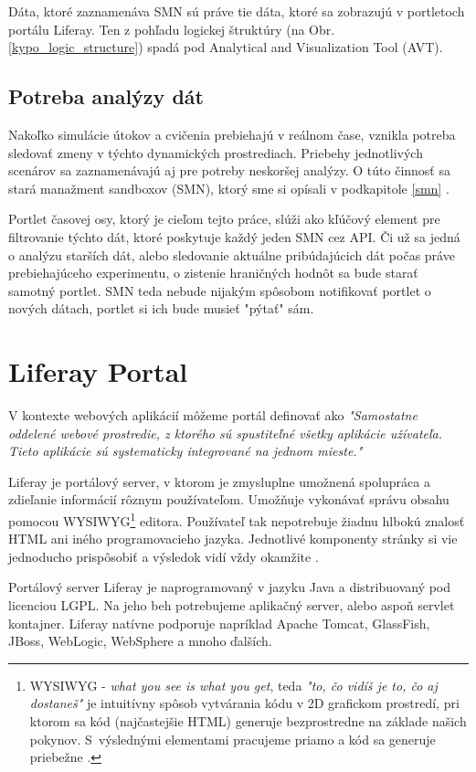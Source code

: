 \documentclass[
  printed, %
  twoside, %
  notable,   %
  nolof,   %
  nolot,   %
]{fithesis3}
\newcommand{\inquotes}[1]{{}"{}#1{}"{}}
\begin{document}
Dáta, ktoré zaznamenáva SMN sú práve tie dáta, ktoré sa zobrazujú v portletoch portálu Liferay. Ten z pohľadu logickej štruktúry (na Obr. \ref{kypo_logic_structure}) spadá pod Analytical and Visualization Tool (AVT).

\section{Potreba analýzy dát}
Nakoľko simulácie útokov a cvičenia prebiehajú v reálnom čase, vznikla potreba sledovať zmeny v týchto dynamických prostrediach. Priebehy jednotlivých scenárov sa zaznamenávajú aj pre potreby neskoršej analýzy. O túto činnosť sa stará manažment sandboxov (SMN), ktorý sme si opísali v podkapitole \ref{smn} .

Portlet časovej osy, ktorý je cieľom tejto práce, slúži ako kľúčový element pre filtrovanie týchto dát, ktoré poskytuje každý jeden SMN cez API. Či už sa jedná o analýzu starších dát, alebo sledovanie aktuálne pribúdajúcich dát počas práve prebiehajúceho experimentu, o zistenie hraničných hodnôt sa bude starať samotný portlet. SMN teda nebude nijakým spôsobom notifikovať portlet o nových dátach, portlet si ich bude musieť \inquotes{pýtať} sám.

\chapter{Liferay Portal}
\label{liferay}
V kontexte webových aplikácií môžeme portál definovať \cite{sezov2011liferay} ako \textit{"Samostatne oddelené webové prostredie, z ktorého sú spustiteľné všetky aplikácie užívateľa. Tieto aplikácie sú systematicky integrované na jednom mieste."}

Liferay je portálový server, v ktorom je zmysluplne umožnená spolupráca a zdieľanie informácií rôznym používateľom. Umožňuje vykonávať správu obsahu pomocou WYSIWYG\footnote{WYSIWYG - \textit{what you see is what you get}, teda \textit{"to, čo vidíš je to, čo aj dostaneš"} je intuitívny spôsob vytvárania kódu v 2D grafickom prostredí, pri ktorom sa kód (najčastejšie HTML) generuje bezprostredne na základe našich pokynov. S~výslednými elementami pracujeme priamo a kód sa generuje priebežne \cite{guo2011wysiwyg}.} editora. Používateľ tak nepotrebuje žiadnu hlbokú znalosť HTML ani iného programovacieho jazyka. Jednotlivé komponenty stránky si vie jednoducho prispôsobiť a výsledok vidí vždy okamžite \cite{sezov2011liferay}.

Portálový server Liferay je naprogramovaný v jazyku Java a distribuovaný pod licenciou LGPL. Na jeho beh potrebujeme aplikačný server, alebo aspoň servlet kontajner. Liferay natívne podporuje napríklad Apache Tomcat, GlassFish, JBoss, WebLogic, WebSphere a mnoho ďalších.
\end{document}

